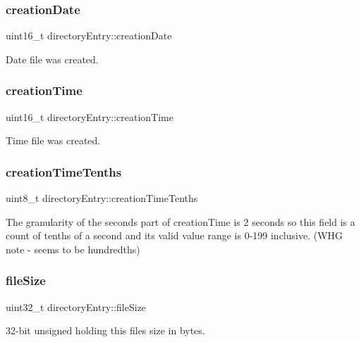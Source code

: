 \subsubsection{\texorpdfstring{creation\+Date}{creationDate}}
{\footnotesize\ttfamily uint16\+\_\+t directory\+Entry\+::creation\+Date}

Date file was created. \mbox{\label{structdirectory_entry_a622bfa70c2cd9006108d7473d737a953}} 
\subsubsection{\texorpdfstring{creation\+Time}{creationTime}}
{\footnotesize\ttfamily uint16\+\_\+t directory\+Entry\+::creation\+Time}

Time file was created. \mbox{\label{structdirectory_entry_aa5e1ce5b411b88f005b28a3e7c7c5af6}} 
\subsubsection{\texorpdfstring{creation\+Time\+Tenths}{creationTimeTenths}}
{\footnotesize\ttfamily uint8\+\_\+t directory\+Entry\+::creation\+Time\+Tenths}

The granularity of the seconds part of creation\+Time is 2 seconds so this field is a count of tenths of a second and its valid value range is 0-\/199 inclusive. (W\+HG note -\/ seems to be hundredths) \mbox{\label{structdirectory_entry_ac2445d99b50f925f662952e0ccd26a02}} 
\subsubsection{\texorpdfstring{file\+Size}{fileSize}}
{\footnotesize\ttfamily uint32\+\_\+t directory\+Entry\+::file\+Size}

32-\/bit unsigned holding this file\textquotesingle{}s size in bytes. \mbox{\label{structdirectory_entry_a3b492598b2b05e8425d2a500443613bd}} 
